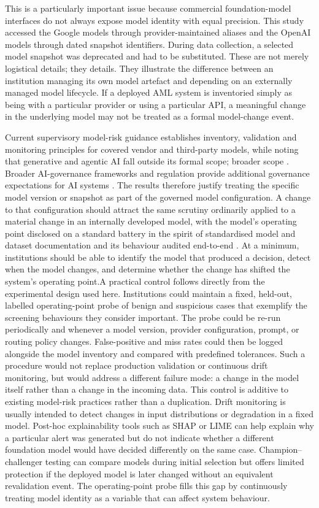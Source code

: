 \documentclass[pdflatex,sn-basic,Numbered]{sn-jnl}
\newcommand{\HLtext}[1]{\texthl{#1}}
\newcommand{\HLdel}[1]{\textcolor{HLink}{\sout{#1}}}
\renewcommand{\HLtext}[1]{#1}\renewcommand{\HLdel}[1]{#1}%
\begin{document}
This is a particularly important issue because commercial foundation-model interfaces do not always expose model identity with equal precision. This study accessed the Google models through provider-maintained aliases and the OpenAI models through dated snapshot identifiers. During data collection, a selected model snapshot was deprecated and had to be substituted. These are not merely logistical \HLdel{details; they} \HLtext{details. They} illustrate the difference between an institution managing its own model artefact and depending on an externally managed model lifecycle. If a deployed AML system is inventoried simply as being with a particular provider or using a particular API, a meaningful change in the underlying model may not be treated as a formal model-change event.

Current supervisory model-risk guidance establishes inventory, validation and monitoring principles for covered vendor and third-party models, while noting that generative and agentic AI fall outside its formal \HLdel{scope; broader} \HLtext{scope} \cite{srguidance}\HLtext{. Broader} AI-governance frameworks and regulation provide additional governance expectations for AI systems \cite{aiact,nistrmf}. The results therefore justify treating the specific model version or snapshot as part of the governed model configuration. A change to that configuration should attract the same scrutiny ordinarily applied to a material change in an internally developed model, with the model's operating point disclosed on a standard battery in the spirit of standardised model and dataset documentation \cite{modelcards,datasheets} and its behaviour audited end-to-end \cite{accountability}. At a minimum, institutions should be able to identify the model that produced a decision, detect when the model changes, and determine whether the change has shifted the system's operating point.\HLdel{A practical control follows directly from the experimental design used here. Institutions could maintain a fixed, held-out, labelled operating-point probe of benign and suspicious cases that exemplify the screening behaviours they consider important. The probe could be re-run periodically and whenever a model version, provider configuration, prompt, or routing policy changes. False-positive and miss rates could then be logged alongside the model inventory and compared with predefined tolerances. Such a procedure would not replace production validation or continuous drift monitoring, but would address a different failure mode: a change in the model itself rather than a change in the incoming data.} \HLdel{This control is additive to existing model-risk practices rather than a duplication. Drift monitoring is usually intended to detect changes in input distributions or degradation in a fixed model. Post-hoc explainability tools such as SHAP or LIME can help explain why a particular alert was generated but do not indicate whether a different foundation model would have decided differently on the same case. Champion--challenger testing can compare models during initial selection but offers limited protection if the deployed model is later changed without an equivalent revalidation event. The operating-point probe fills this gap by continuously treating model identity as a variable that can affect system behaviour.} 
\end{document}
